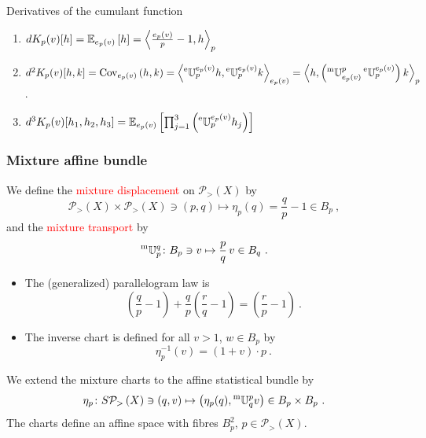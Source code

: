 \documentclass[xcolor=svgnames]{beamer}
\newcommand{\Bspaceat}[1]{B_{#1}}
\newcommand{\rosso}[1]{\textcolor{red}{#1}}
\newcommand{\opensimplexon}[1]{\mathcal P_>\left(#1\right)}
\renewcommand{\emph}{\rosso}
\begin{document}
\begin{frame}
\begin{block}{Derivatives of the cumulant function}
  \begin{enumerate}
     \item \emph{$d K_p(v)[h] = \expectat {e_p(v)} {h} = \scalarat {p} {\frac{e_p(v)}{p}-1}{h}$}

    \item \emph{$d^2 K_p(v) [h,k] = \covat {e_p(v)} h k = \scalarat {e_p(v)} {\etransport p {e_p(v)} h}{\etransport p {e_p(v)} k} = \scalarat p h {\left(\mtransport {e_p(v)} p \etransport p {e_p(v)}\right) k}$}.

    \item \emph{$d^3 K_p(v) [h_1,h_2,h_3] = \expectat {e_p(v)}{\prod_{j=1}^3 \left(\etransport p {e_p(v)} h_j\right)}$}
    \end{enumerate}
\end{block}
\end{frame}

\begin{frame}\small\frametitle{Mixture affine bundle}
\begin{block}{}
      We define the \emph{mixture displacement} on $\opensimplexon X$ by
       \begin{equation*}
      \opensimplexon X \times \opensimplexon X \ni (p,q) \mapsto \eta_p(q) = \frac q p - 1 \in \Bspaceat p \ ,
    \end{equation*}
    and the \emph{mixture transport} by
    \begin{equation*}
      \mtransport p q \colon \Bspaceat p \ni v \mapsto \frac p q \, v \in \Bspaceat q \ .
    \end{equation*}
\end{block}

\begin{itemize}  
\item The (generalized) parallelogram law is
  \begin{equation*}
 \left(\frac q p -1\right) + \frac q p \left(\frac r q -1\right) = \left(\frac r p -1\right) \ .
\end{equation*}
\item The inverse chart is defined for all $v > 1$, $w \in \Bspaceat p$ by
  \begin{equation*}
    \eta^{-1}_p(v) =  (1+v) \cdot p \ .
  \end{equation*}
\end{itemize} 

\begin{block}{} We extend the mixture charts to the affine statistical bundle by
    \begin{equation*}
\eta_p \colon S\opensimplexon X \ni (q,v) \mapsto \left(\eta_p(q), \mtransport q p v \right) \in B_p \times B_p \ .        
    \end{equation*}
    The charts define an affine space with fibres $B_p^2$, $p \in \opensimplexon X$.
\end{block}

\end{frame}
\end{document}
